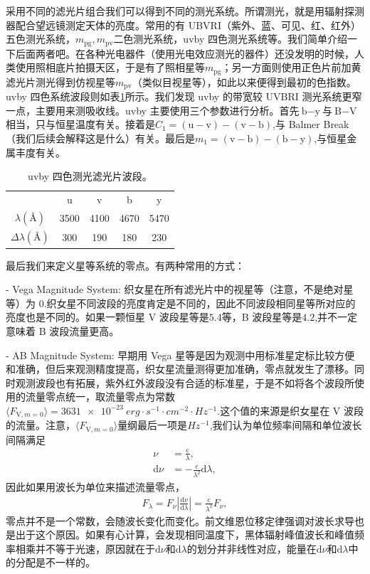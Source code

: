 \documentclass[../天体物理基础.tex]{subfiles}
\begin{document}
采用不同的滤光片组合我们可以得到不同的测光系统。所谓测光，就是用辐射探测器配合望远镜测定天体的亮度。常用的有 UBVRI（紫外、蓝、可见、红、红外）五色测光系统，$m_{\text{pg}},m_{\text{pv}}$二色测光系统，uvby 四色测光系统等。我们简单介绍一下后面两者吧。在各种光电器件（使用光电效应测光的器件）还没发明的时候，人类使用照相底片拍摄天区，于是有了照相星等$m_{\text{pg}}$；另一方面则使用正色片前加黄滤光片测光得到仿视星等$m_{\text{pv}}$（类似目视星等），如此以来便得到最初的色指数。uvby 四色系统波段则如表\ref{uvby 四色测光滤光片波段。}所示。我们发现 uvby 的带宽较 UVBRI 测光系统更窄一点，主要用来测吸收线。uvby 主要使用三个参数进行分析。首先$\text{b}-\text{y}$与$\text{B}-\text{V}$相当，只与恒星温度有关。接着是$C_{1}=\left(\text{u}-\text{v}\right)-\left(\text{v}-\text{b}\right)$,与 Balmer Break（我们后续会解释这是什么）有关。最后是$m_{1}=\left(\text{v}-\text{b}\right)-\left(\text{b}-\text{y}\right)$,与恒星金属丰度有关。

\begin{table}[htbp]
\centering
\caption{uvby 四色测光滤光片波段。}
\begin{tabular}{c c c c c}
\hline
 & u & v & b & y\\
\cline{1-5}
$\lambda\left(\si{\angstrom}\right)$ & 3500 & 4100 & 4670 & 5470\\
\cline{1-5}
$\Delta{}\lambda\left(\si{\angstrom}\right)$ & 300 & 190 & 180 & 230\\
\cline{1-5}
\end{tabular}
\label{uvby 四色测光滤光片波段。}
\end{table}

最后我们来定义星等系统的零点。有两种常用的方式：

- Vega Magnitude System: 织女星在所有滤光片中的视星等（注意，不是绝对星等）为 0.织女星不同波段的亮度肯定是不同的，因此不同波段相同星等所对应的亮度也是不同的。如果一颗恒星 V 波段星等是$5.4$等，B 波段星等是$4.2$,并不一定意味着 B 波段流量更高。

- AB Magnitude System: 早期用 Vega 星等是因为观测中用标准星定标比较方便和准确，但后来观测精度提高，织女星流量测得更加准确，零点就发生了漂移。同时观测波段也有拓展，紫外红外波段没有合适的标准星，于是不如将各个波段所使用的流量零点统一，取流量零点为常数$\langle F_{\text{V},m=0}\rangle=\qty{3631e-23}{erg\cdot{}s^{-1}\cdot cm^{-2}\cdot Hz^{-1}}$.这个值的来源是织女星在 V 波段的流量。注意，$\langle{}F_{\text{V},m=0}\rangle$量纲最后一项是$\unit{Hz^{-1}}$,我们认为单位频率间隔和单位波长间隔满足
\begin{align}
\nu&=\frac{\mathrm{c}}{\lambda},\\
\mathrm{d}\nu&=-\frac{\mathrm{c}}{\lambda^{2}}\mathrm{d}\lambda,
\end{align}
因此如果用波长为单位来描述流量零点，
\begin{align}
F_{\lambda}=F_{\nu}\left\vert{}\frac{\mathrm{d}\nu}{\mathrm{d}\lambda}\right\vert{}=\frac{\mathrm{c}}{\lambda^{2}}F_{\nu},
\end{align}
零点并不是一个常数，会随波长变化而变化。前文维恩位移定律强调对波长求导也是出于这个原因。如果有心计算，会发现相同温度下，黑体辐射峰值波长和峰值频率相乘并不等于光速，原因就在于$\mathrm{d}\nu$和$\mathrm{d}\lambda$的划分并非线性对应，能量在$\mathrm{d}\nu$和$\mathrm{d}\lambda$中的分配是不一样的。
\end{document}
